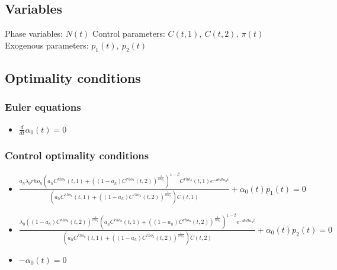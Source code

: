 \documentclass{article}
\begin{document}
\subsection{Variables}


Phase variables: $N{\left(t \right)}$
\newline
Control parameters: $C{\left(t,1 \right)},~C{\left(t,2 \right)},~\pi{\left(t \right)}$
\newline
Exogenous parameters: $p_{1}{\left(t \right)},~p_{2}{\left(t \right)}$

\subsection{Optimality conditions}

\subsubsection{Euler equations}
\begin{itemize}
    \item $\frac{d}{d t} \alpha_{0}{\left(t \right)} = 0$
\end{itemize}

\subsubsection{Control optimality conditions}
\begin{itemize}
    \item $\frac{a_{h} \lambda_{0} rho_{h} \left(a_{h} C^{rho_{h}}{\left(t,1 \right)} + \left(\left(1 - a_{h}\right) C^{rho_{h}}{\left(t,2 \right)}\right)^{\frac{1}{rho_{h}}}\right)^{1 - \beta} C^{rho_{h}}{\left(t,1 \right)} e^{- delta_{h} t}}{\left(a_{h} C^{rho_{h}}{\left(t,1 \right)} + \left(\left(1 - a_{h}\right) C^{rho_{h}}{\left(t,2 \right)}\right)^{\frac{1}{rho_{h}}}\right) C{\left(t,1 \right)}} + \alpha_{0}{\left(t \right)} p_{1}{\left(t \right)} = 0$
    \item $\frac{\lambda_{0} \left(\left(1 - a_{h}\right) C^{rho_{h}}{\left(t,2 \right)}\right)^{\frac{1}{rho_{h}}} \left(a_{h} C^{rho_{h}}{\left(t,1 \right)} + \left(\left(1 - a_{h}\right) C^{rho_{h}}{\left(t,2 \right)}\right)^{\frac{1}{rho_{h}}}\right)^{1 - \beta} e^{- delta_{h} t}}{\left(a_{h} C^{rho_{h}}{\left(t,1 \right)} + \left(\left(1 - a_{h}\right) C^{rho_{h}}{\left(t,2 \right)}\right)^{\frac{1}{rho_{h}}}\right) C{\left(t,2 \right)}} + \alpha_{0}{\left(t \right)} p_{2}{\left(t \right)} = 0$
    \item $- \alpha_{0}{\left(t \right)} = 0$
\end{itemize}
\end{document}

